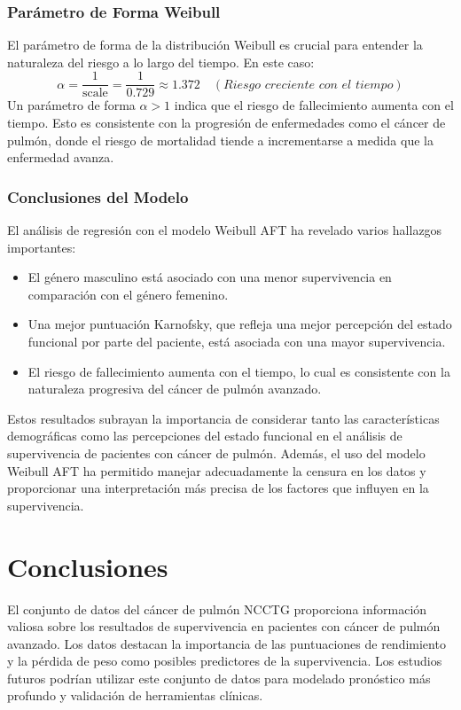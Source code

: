 \documentclass[a4paper,12pt]{article}
\begin{document}
\subsubsection*{Parámetro de Forma Weibull}
El parámetro de forma de la distribución Weibull es crucial para entender la naturaleza del riesgo a lo largo del tiempo. En este caso:
\begin{equation*}
\alpha = \frac{1}{\text{scale}} = \frac{1}{0.729} \approx 1.372 \quad (\textit{Riesgo creciente con el tiempo})
\end{equation*}
Un parámetro de forma $\alpha > 1$ indica que el riesgo de fallecimiento aumenta con el tiempo. Esto es consistente con la progresión de enfermedades como el cáncer de pulmón, donde el riesgo de mortalidad tiende a incrementarse a medida que la enfermedad avanza.

\subsubsection*{Conclusiones del Modelo}
El análisis de regresión con el modelo Weibull AFT ha revelado varios hallazgos importantes:
\begin{itemize}
\item El género masculino está asociado con una menor supervivencia en comparación con el género femenino.
\item Una mejor puntuación Karnofsky, que refleja una mejor percepción del estado funcional por parte del paciente, está asociada con una mayor supervivencia.
\item El riesgo de fallecimiento aumenta con el tiempo, lo cual es consistente con la naturaleza progresiva del cáncer de pulmón avanzado.
\end{itemize}
Estos resultados subrayan la importancia de considerar tanto las características demográficas como las percepciones del estado funcional en el análisis de supervivencia de pacientes con cáncer de pulmón. Además, el uso del modelo Weibull AFT ha permitido manejar adecuadamente la censura en los datos y proporcionar una interpretación más precisa de los factores que influyen en la supervivencia.

\section*{Conclusiones}
El conjunto de datos del cáncer de pulmón NCCTG proporciona información valiosa sobre los resultados de supervivencia en pacientes con cáncer de pulmón avanzado. Los datos destacan la importancia de las puntuaciones de rendimiento y la pérdida de peso como posibles predictores de la supervivencia. Los estudios futuros podrían utilizar este conjunto de datos para modelado pronóstico más profundo y validación de herramientas clínicas.
\end{document}
